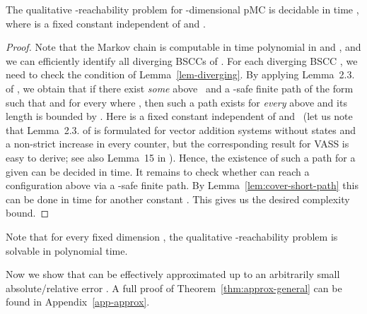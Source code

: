 \begin{theorem}
\label{thm:qual-all-algorithm}
  The qualitative -reachability problem for \mbox{-dimensional}
  pMC is decidable in time , where  is 
  a fixed constant independent of  and . 
\end{theorem}
\begin{proof}
  Note that the Markov chain  is computable in time polynomial
  in  and , and we can efficiently identify all diverging
  BSCCs of . For each diverging BSCC , we need to check the
  condition of Lemma~\ref{lem-diverging}. By applying Lemma~2.3.{}
  of \cite{RY:VASS-JCSS}, we obtain that if there exist \emph{some}  
  above~ and a -safe finite path of the form 
   such that 
  and  for every  where ,
  then such a path exists for \emph{every}  above
   and its length is bounded by . Here
   is a fixed constant independent of  and~ (let us
  note that Lemma~2.3.{} of \cite{RY:VASS-JCSS} is formulated for 
  vector addition
  systems without states and a non-strict increase in every counter, 
  but the corresponding result for VASS is easy
  to derive; see also Lemma~15 in \cite{BJK:VASS-games-arxiv}). 
  Hence, the existence
  of such a path for a given  can be decided in 
   time. It remains to check whether 
  can reach a configuration  above   via
  a -safe finite path. By Lemma~\ref{lem:cover-short-path} this can be done in time  for another constant . This gives us the desired complexity bound.
\end{proof}




















\smallskip

Note that for every fixed dimension , the qualitative 
\mbox{-reachability} problem is solvable in polynomial time.









Now we show that  can be effectively 
approximated up to an arbitrarily small absolute/relative error 
. A full proof of Theorem~\ref{thm:approx-general}
can be found in Appendix~\ref{app-approx}.

